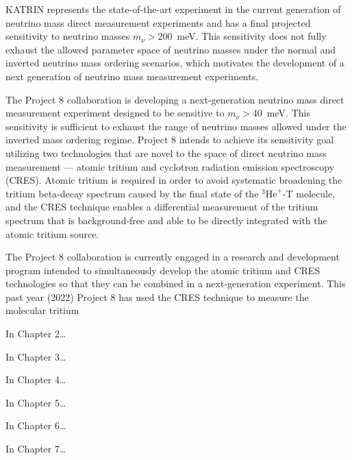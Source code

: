 KATRIN represents the state-of-the-art experiment in the current generation of neutrino mass direct measurement experiments and has a final projected sensitivity to neutrino masses $m_\nu > 200$~meV. This sensitivity does not fully exhaust the allowed parameter space of neutrino masses under the normal and inverted neutrino mass ordering scenarios, which motivates the development of a next generation of neutrino mass measurement experiments. 

The Project 8 collaboration is developing a next-generation neutrino mass direct measurement experiment designed to be sensitive to $m_\nu>40$~meV. This sensitivity is sufficient to exhaust the range of neutrino masses allowed under the inverted mass ordering regime. Project 8 intends to achieve its sensitivity goal utilizing two technologies that are novel to the space of direct neutrino mass measurement --- atomic tritium and cyclotron radiation emission spectroscopy (CRES). Atomic tritium is required in order to avoid systematic broadening the tritium beta-decay spectrum caused by the final state of the $^3\textrm{He}^+$-T molecule, and the CRES technique enables a differential measurement of the tritium spectrum that is background-free and able to be directly integrated with the atomic tritium source.

The Project 8 collaboration is currently engaged in a research and development program intended to simultaneously develop the atomic tritium and CRES technologies so that they can be combined in a next-generation experiment. This past year (2022) Project 8 has used the CRES technique to measure the molecular tritium 

In Chapter 2\ldots

In Chapter 3\ldots

In Chapter 4\ldots

In Chapter 5\ldots

In Chapter 6\ldots

In Chapter 7\ldots





